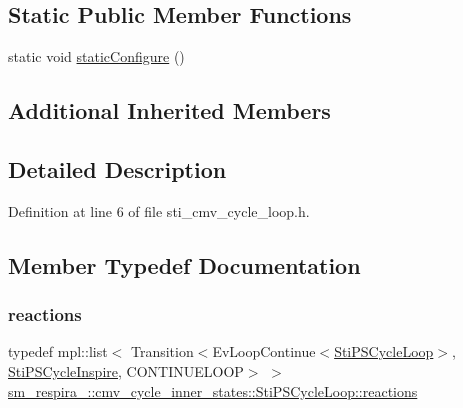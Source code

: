 \subsection*{Static Public Member Functions}
\begin{DoxyCompactItemize}
\item 
static void \hyperlink{structsm__respira__1_1_1cmv__cycle__inner__states_1_1StiPSCycleLoop_a7856305b3ed2b17640521d53f00c9547}{static\+Configure} ()
\end{DoxyCompactItemize}
\subsection*{Additional Inherited Members}


\subsection{Detailed Description}


Definition at line 6 of file sti\+\_\+cmv\+\_\+cycle\+\_\+loop.\+h.



\subsection{Member Typedef Documentation}
\mbox{\label{structsm__respira__1_1_1cmv__cycle__inner__states_1_1StiPSCycleLoop_a052fbb8e2512f8508670de09483cead5}} 
\subsubsection{\texorpdfstring{reactions}{reactions}}
{\footnotesize\ttfamily typedef mpl\+::list$<$ Transition$<$Ev\+Loop\+Continue$<$\hyperlink{structsm__respira__1_1_1cmv__cycle__inner__states_1_1StiPSCycleLoop}{Sti\+P\+S\+Cycle\+Loop}$>$, \hyperlink{structsm__respira__1_1_1cmv__cycle__inner__states_1_1StiPSCycleInspire}{Sti\+P\+S\+Cycle\+Inspire}, C\+O\+N\+T\+I\+N\+U\+E\+L\+O\+OP$>$ $>$ \hyperlink{structsm__respira__1_1_1cmv__cycle__inner__states_1_1StiPSCycleLoop_a052fbb8e2512f8508670de09483cead5}{sm\+\_\+respira\+\_\+::cmv\+\_\+cycle\+\_\+inner\+\_\+states\+::\+Sti\+P\+S\+Cycle\+Loop\+::reactions}}



